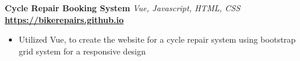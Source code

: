 \documentclass[a4paper]{article}
\begin{document}
{\textbf{Cycle Repair Booking System}} {\sl Vue, Javascript, HTML, CSS} \hfill \textbf{\href{https://muizzzafar11.github.io/bikerepairs/}{https://bikerepairs.github.io}}\\
 \begin{itemize} \itemsep -2pt
    \item Utilized Vue, to create the website for a cycle repair system using bootstrap grid system for a responsive design
\end{itemize}

\vspace{4mm}
\end{document}
